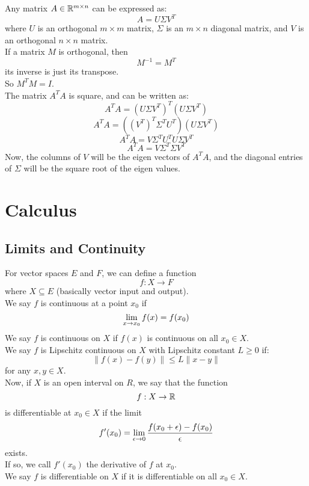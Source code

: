 \documentclass[12pt]{article}
\begin{document}
    Any matrix $A \in \mathbb{R}^{m \times n}$
    can be expressed as:
    \[ A = U\Sigma V^T \]
    where $U$ is an orthogonal $m \times m$ matrix,
    $\Sigma$ is an $m \times n$ diagonal matrix,
    and $V$ is an orthogonal $n \times n$ matrix. \\

    If a matrix $M$ is orthogonal, then
    \[ M^{-1} = M^T \]
    its inverse is just its transpose. \\
    So $M^TM = I$. \\

    The matrix $A^TA$ is square, 
    and can be written as:
    \[A^TA =  (U\Sigma V^T)^T(U\Sigma V^T)\]
    \[A^TA =  ((V^T)^T\Sigma^TU^T)(U\Sigma V^T)\]
    \[A^TA =  V\Sigma^TU^TU\Sigma V^T \]
    \[A^TA =  V\Sigma^T\Sigma V^T\]
    Now, the columns of $V$
    will be the eigen vectors of $A^TA$,
    and the diagonal entries of $\Sigma$
    will be the square root of the eigen values. \\
 
    \newpage

    \section*{Calculus}

    \subsection*{Limits and Continuity}

    For vector spaces $E$ and $F$,
    we can define a function
    \[ f: X \to F \]
    where $X \subseteq E$
    (basically vector input and output). \\

    We say $f$ is continuous at a point $x_0$
    if
    \[ \lim_{x \to x_0} f(x) = f(x_0) \]
    We say $f$ is continuous on $X$
    if $f(x)$ is continuous on all $x_0 \in X$. \\

    We say $f$ is Lipschitz continuous on $X$
    with Lipschitz constant $L \geq 0$ if: 
    \[ \| f(x) - f(y) \| \leq L \| x - y \| \]
    for any $x, y \in X$. \\

    Now, if $X$ is an open interval on $R$,
    we say that the function
    \[ f: X \to \mathbb{R} \]
    is differentiable at $x_0 \in X$ if the limit
    \[ f'(x_0) = \lim_{\epsilon \to 0} 
        \dfrac{f(x_0+\epsilon) - f(x_0)}{\epsilon}
   \]
    exists. \\
    If so, we call $f'(x_0)$
    the derivative of $f$ at $x_0$. \\
    We say $f$ is differentiable on $X$
    if it is differentiable on all $x_0 \in X$. \\
\end{document}
